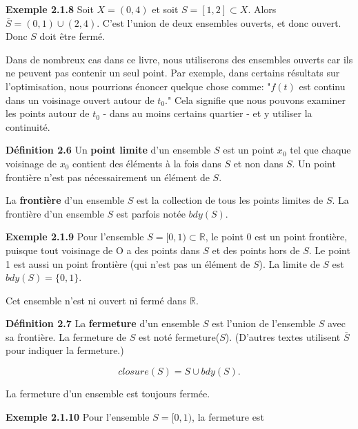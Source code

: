 \documentclass[10pt,twoside,a4paper]{book}
\begin{document}
\vspace{4mm}
\noindent
\textbf{Exemple 2.1.8} Soit $X = (0, 4)$ et soit $S = [1, 2] \subset X$. Alors $\bar{S} = (0,1) \cup (2, 4)$. C'est l'union de deux ensembles ouverts, et donc ouvert. Donc $S$ doit être fermé.

\vspace{2mm}
Dans de nombreux cas dans ce livre, nous utiliserons des ensembles ouverts car ils ne peuvent pas contenir un seul point. Par exemple, dans certains résultats sur l'optimisation, nous pourrions énoncer quelque chose comme: "$f(t)$ est continu dans un voisinage ouvert autour de $t_0$." 
Cela signifie que nous pouvons examiner les points autour de $t_0$ - dans au moins certains quartier - et y utiliser la continuité.

\vspace{4mm}
\noindent
\textbf{Définition 2.6} Un \textbf{point limite} d'un ensemble $S$ est un point $x_0$ tel que chaque voisinage de $x_0$ contient des éléments à la fois dans $S$ et non dans $S$. Un point frontière n'est pas nécessairement un élément de $S$.

La \textbf{frontière} d'un ensemble $S$ est la collection de tous les points limites de $S$. La frontière d'un ensemble $S$ est parfois notée $bdy(S)$.

\vspace{4mm}
\noindent
\textbf{Exemple 2.1.9} Pour l'ensemble $S = [0, 1) \subset \mathbb{R}$, le point 0 est un point frontière, puisque tout voisinage de O a des points dans $S$ et des points hors de $S$. Le point 1 est aussi un point frontière (qui n'est pas un élément de $S$). La limite de $S$ est $bdy(S) = \{0, 1\}$.

Cet ensemble n'est ni ouvert ni fermé dans $\mathbb{R}$.

\vspace{4mm}
\noindent
\textbf{Définition 2.7} La \textbf{fermeture} d'un ensemble $S$ est l'union de l'ensemble $S$ avec sa frontière. La fermeture
de $S$ est noté fermeture($S$). (D'autres textes utilisent $\bar{S}$ pour indiquer la fermeture.)

\begin{equation*}
  closure(S) = S \cup bdy(S).
\end{equation*}

\noindent
La fermeture d'un ensemble est toujours fermée.

\vspace{4mm}
\noindent
\textbf{Exemple 2.1.10} Pour l'ensemble $S = [0, 1)$, la fermeture est
\end{document}
